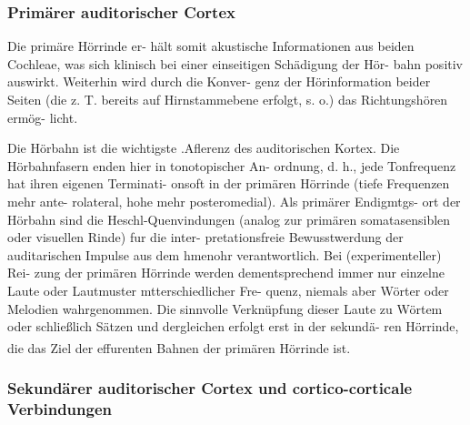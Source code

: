 \documentclass[12pt,a4paper,pdftex]{article}
\begin{document}

\subsubsection*{Primärer auditorischer Cortex}

Die primäre Hörrinde er-
hält somit akustische Informationen aus beiden Cochleae,
was sich klinisch bei einer einseitigen Schädigung der Hör-
bahn positiv auswirkt. Weiterhin wird durch die Konver-
genz der Hörinformation beider Seiten (die z. T. bereits auf
Hirnstammebene erfolgt, s. o.) das Richtungshören ermög-
licht. 

Die Hörbahn ist die wichtigste .Aflerenz des auditorischen
Kortex. Die Hörbahnfasern enden hier in tonotopischer An-
ordnung, d. h., jede Tonfrequenz hat ihren eigenen Terminati-
onsoft in der primären Hörrinde (tiefe Frequenzen mehr ante-
rolateral, hohe mehr posteromedial). Als primärer Endigmtgs-
ort der Hörbahn sind die Heschl-Quenvindungen (analog zur
primären somatasensiblen oder visuellen Rinde) fur die inter-
pretationsfreie Bewusstwerdung der auditarischen Impulse
aus dem hmenohr verantwortlich. Bei (experimenteller) Rei-
zung der primären Hörrinde werden dementsprechend immer
nur einzelne Laute oder Lautmuster mtterschiedlicher Fre-
quenz, niemals aber Wörter oder Melodien wahrgenommen.
Die sinnvolle Verknüpfung dieser Laute zu Wörtem oder
schließlich Sätzen und dergleichen erfolgt erst in der sekundä-
ren Hörrinde, die das Ziel der effurenten Bahnen der primären
Hörrinde ist.
\textsuperscript{\cite[9.9]{trepel2011neuroanatomie}}

\subsubsection{Sekundärer auditorischer Cortex und cortico-corticale Verbindungen}
\end{document}
